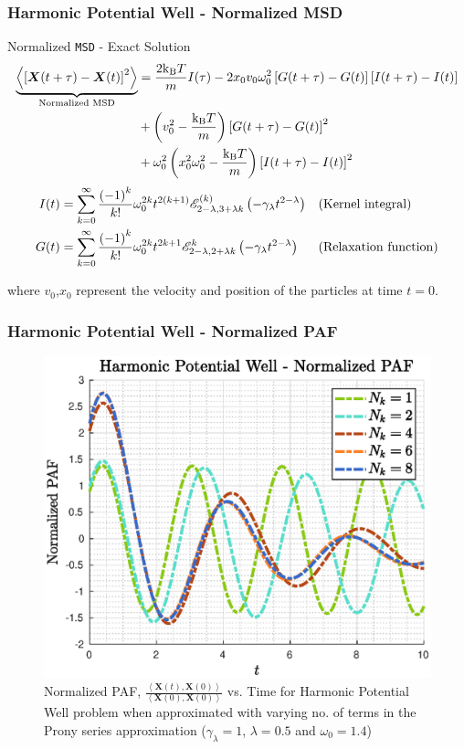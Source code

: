 \documentclass[a4paper,10pt]{beamer}
\newcommand{\BS}[1]{\boldsymbol{#1}}
\newcommand{\sqb}[1]{\left[ #1 \right]}
\newcommand{\rb}[1]{\left( #1 \right)}
\newcommand{\angbrac}[1]{\left \langle #1 \right \rangle}
\begin{document}
	\begin{frame}
		\frametitle{Harmonic Potential Well - Normalized MSD}
		\begin{alertblock}{Normalized \texttt{MSD} - Exact Solution}
			\footnotesize
			\begin{align}
				\notag
				\underbrace{\angbrac{\sqb{\BS{X}(t+\tau)-\BS{X}(t)}^{2}}}_{\text{Normalized MSD}} &= \frac{2\text{k}_{\text{B}}T}{m} I(\tau) - 2 x_{0} v_{0} \omega_{0}^{2} \sqb{G(t+\tau) - G(t)}\sqb{I(t+\tau) - I(t)} \\
				\notag 
				&+ \rb{v_{0}^{2} - \frac{\text{k}_{\text{B}}T}{m}} \sqb{G(t+\tau)-G(t)}^{2} \\
				\notag
				&+ \omega_{0}^{2} \rb{x_{0}^{2} \omega_{0}^{2} - \frac{\text{k}_\text{B} T}{m}} \sqb{I(t+\tau)-I(t)}^{2}
			\end{align}
			\begin{align}
				\notag
				I(t) &= \sum_{k=0}^{\infty} \frac{\rb{-1}^{k}}{k!} \omega_{0}^{2k} t^{2(k+1)} \mathscr{E}^{(k)}_{2-\lambda,3+\lambda k} \rb{- \gamma_{\lambda} t^{2-\lambda}} && \text{(Kernel integral)}\\
				\notag
				G(t) &= \sum_{k=0}^{\infty} \frac{\rb{-1}^{k}}{k!} \omega_{0}^{2k} t^{2k+1} \mathscr{E}^{k}_{2-\lambda,2+\lambda k} \rb{- \gamma_{\lambda} t^{2-\lambda}} && \text{(Relaxation function)}
			\end{align}
		\end{alertblock}
		where $v_{0}$,$x_{0}$ represent the velocity and position of the particles at time $t=0$.
	\end{frame}

	\begin{frame}
		\frametitle{Harmonic Potential Well - Normalized PAF}
		\begin{figure}[H]
			\includegraphics[width=0.75\linewidth]{./Plots/normalizedPAFPlots/normPAF.eps}
			\caption{Normalized PAF, $ \frac{\angbrac{\BS{X}(t),\BS{X}(0)}}{\angbrac{\BS{X}(0),\BS{X}(0)}}$ vs. Time for Harmonic Potential Well problem when approximated with varying no. of terms in the Prony series approximation ($\gamma_{\lambda} = 1$, $\lambda = 0.5$ and $\omega_{0} = 1.4$)}
		\end{figure}
	\end{frame}
\end{document}
